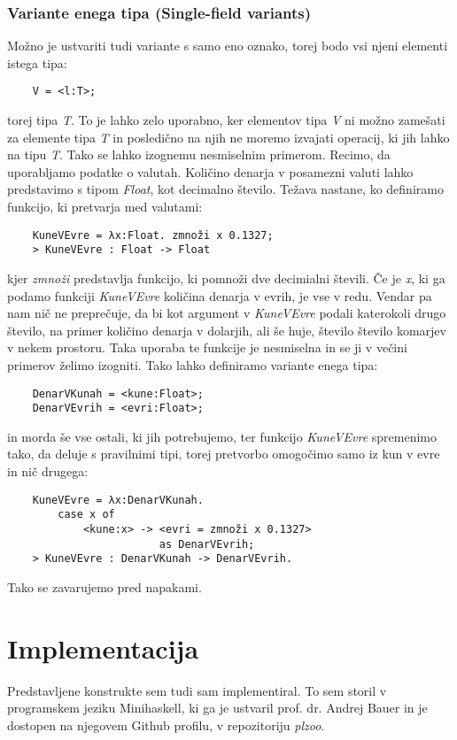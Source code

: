 \documentclass[12pt,a4paper,openany]{book}
\begin{document}
\subsection{Variante enega tipa (Single-field variants)}
Možno je ustvariti tudi variante s samo eno oznako, torej bodo vsi njeni elementi istega tipa:
\begin{lstlisting}
    V = <l:T>;
\end{lstlisting}
torej tipa \emph{T}. To je lahko zelo uporabno, ker elementov tipa \emph{V} ni možno zamešati za elemente tipa \emph{T} in posledično na njih ne moremo izvajati operacij, ki jih lahko na tipu 
\emph{T}. Tako se lahko izognemu nesmiselnim primerom. Recimo, da uporabljamo podatke o valutah. Količino denarja v posamezni valuti lahko predstavimo s tipom \emph{Float}, kot decimalno 
število. Težava nastane, ko definiramo funkcijo, ki pretvarja med valutami:
\begin{lstlisting}
    KuneVEvre = λx:Float. zmnoži x 0.1327;
    > KuneVEvre : Float -> Float
\end{lstlisting}
kjer \emph{zmnoži} predstavlja funkcijo, ki pomnoži dve decimialni števili. Če je \emph{x}, ki ga podamo funkciji \emph{KuneVEvre} količina denarja v evrih, je vse v redu. Vendar pa nam nič ne 
preprečuje, da bi kot argument v \emph{KuneVEvre} podali katerokoli drugo število, na primer količino denarja v dolarjih, ali še huje, število število komarjev v nekem prostoru. Taka uporaba te 
funkcije je nesmiselna in se ji v večini primerov želimo izogniti. Tako lahko definiramo variante enega tipa:
\begin{lstlisting}
    DenarVKunah = <kune:Float>;
    DenarVEvrih = <evri:Float>;
\end{lstlisting}
in morda še vse ostali, ki jih potrebujemo, ter funkcijo \emph{KuneVEvre} spremenimo tako, da deluje s pravilnimi tipi, torej pretvorbo omogočimo 
samo iz kun v evre in nič drugega:
\begin{lstlisting}
    KuneVEvre = λx:DenarVKunah.
        case x of 
            <kune:x> -> <evri = zmnoži x 0.1327> 
                        as DenarVEvrih;
    > KuneVEvre : DenarVKunah -> DenarVEvrih.
\end{lstlisting}
Tako se zavarujemo pred napakami.
\newpage

\chapter{Implementacija}
Predstavljene konstrukte sem tudi sam implementiral. To sem storil v programskem jeziku Minihaskell, ki ga je ustvaril prof. dr. Andrej Bauer in 
je dostopen na njegovem Github profilu, v repozitoriju \emph{plzoo}. 
\end{document}
